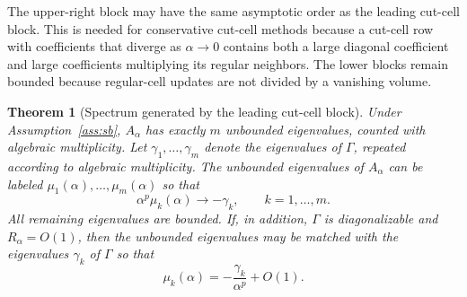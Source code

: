 \documentclass[preprint,12pt]{elsarticle}
\newtheorem{theorem}{Theorem}[section]
\begin{document}
The upper-right block may have the same asymptotic order as the leading cut-cell block.
This is needed for conservative cut-cell methods because a cut-cell row with coefficients that diverge as $\alpha\to0$ contains
both a large diagonal coefficient and large coefficients multiplying its
regular neighbors.  The lower blocks remain bounded because regular-cell
updates are not divided by a vanishing volume.

\begin{theorem}[Spectrum generated by the leading cut-cell block]
\label{thm:singular}
Under Assumption~\ref{ass:sb}, $A_\alpha$ has exactly $m$ unbounded
eigenvalues, counted with algebraic multiplicity.  Let
$\gamma_1,\ldots,\gamma_m$ denote the eigenvalues of $\Gamma$, repeated
according to algebraic multiplicity.  The unbounded eigenvalues of $A_\alpha$
can be labeled $\mu_1(\alpha),\ldots,\mu_m(\alpha)$ so that
\begin{equation}
    \alpha^p\mu_k(\alpha)\longrightarrow-\gamma_k,
    \qquad k=1,\ldots,m.
    \label{eq:scaled-spectrum}
\end{equation}
All remaining eigenvalues are bounded.  If, in addition, $\Gamma$ is
diagonalizable and $R_\alpha=O(1)$, then the unbounded eigenvalues may be
matched with the eigenvalues $\gamma_k$ of $\Gamma$ so that
\begin{equation}
    \mu_k(\alpha)
    =
    -\frac{\gamma_k}{\alpha^p}+O(1).
    \label{eq:large-O1}
\end{equation}
\end{theorem}
\end{document}
